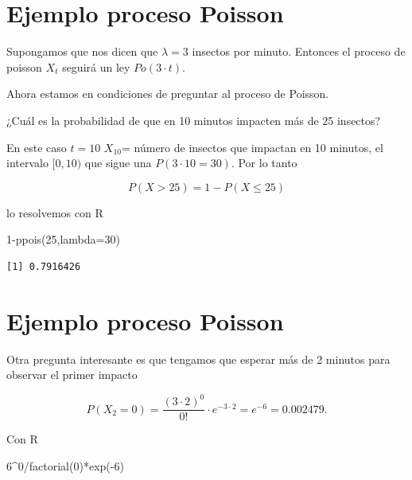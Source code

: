 \documentclass[
  letterpaper,
  DIV=11,
  numbers=noendperiod]{scrreprt}
\newenvironment{Shaded}{\begin{snugshade}}{\end{snugshade}}
\newcommand{\AttributeTok}[1]{\textcolor[rgb]{0.40,0.45,0.13}{#1}}
\newcommand{\DecValTok}[1]{\textcolor[rgb]{0.68,0.00,0.00}{#1}}
\newcommand{\FunctionTok}[1]{\textcolor[rgb]{0.28,0.35,0.67}{#1}}
\newcommand{\NormalTok}[1]{\textcolor[rgb]{0.00,0.23,0.31}{#1}}
\newcommand{\SpecialCharTok}[1]{\textcolor[rgb]{0.37,0.37,0.37}{#1}}
\begin{document}
\section{Ejemplo proceso Poisson}\label{ejemplo-proceso-poisson-2}

Supongamos que nos dicen que \(\lambda=3\) insectos por minuto. Entonces
el proceso de poisson \(X_t\) seguirá un ley \(Po(3\cdot t).\)

Ahora estamos en condiciones de preguntar al proceso de Poisson.

¿Cuál es la probabilidad de que en 10 minutos impacten más de 25
insectos?

En este caso \(t=10\) \(X_{10}\)= número de insectos que impactan en 10
minutos, el intervalo \([0,10)\) que sigue una \(P(3\cdot 10=30)\). Por
lo tanto

\[P(X>25)=1-P(X\leq 25)\]

lo resolvemos con R

\begin{Shaded}
\begin{Highlighting}[]
\DecValTok{1}\SpecialCharTok{{-}}\FunctionTok{ppois}\NormalTok{(}\DecValTok{25}\NormalTok{,}\AttributeTok{lambda=}\DecValTok{30}\NormalTok{)}
\end{Highlighting}
\end{Shaded}

\begin{verbatim}
[1] 0.7916426
\end{verbatim}

\section{Ejemplo proceso Poisson}\label{ejemplo-proceso-poisson-3}

Otra pregunta interesante es que tengamos que esperar más de 2 minutos
para observar el primer impacto

\[P(X_2=0)=\frac{(3\cdot 2)^0}{0!}\cdot e^{-3\cdot 2}= e^{-6}=0.002479.\]

Con R

\begin{Shaded}
\begin{Highlighting}[]
\DecValTok{6}\SpecialCharTok{\^{}}\DecValTok{0}\SpecialCharTok{/}\FunctionTok{factorial}\NormalTok{(}\DecValTok{0}\NormalTok{)}\SpecialCharTok{*}\FunctionTok{exp}\NormalTok{(}\SpecialCharTok{{-}}\DecValTok{6}\NormalTok{)}
\end{Highlighting}
\end{Shaded}
\end{document}
